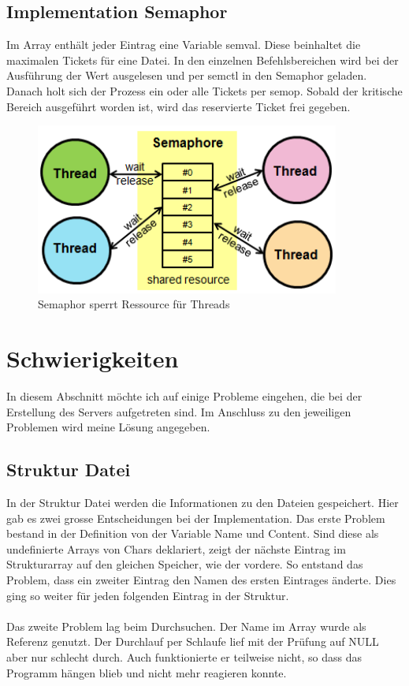\documentclass[12pt,a4paper,ngerman]{report}
\begin{document}
\subsection{Implementation Semaphor}
Im Array enthält jeder Eintrag eine Variable semval. Diese beinhaltet die maximalen Tickets für eine Datei. In den einzelnen Befehlsbereichen wird bei der Ausführung der Wert ausgelesen und per semctl in den Semaphor geladen. Danach holt sich der Prozess ein oder alle Tickets per semop. Sobald der kritische Bereich ausgeführt worden ist, wird das reservierte Ticket frei gegeben.
\begin{figure}[h!]
\centering
\includegraphics[width=10cm]{img/semaphore.png}
\caption{Semaphor sperrt Ressource für Threads\protect\footnotemark}
\end{figure}
\section{Schwierigkeiten}
In diesem Abschnitt möchte ich auf einige Probleme eingehen, die bei der Erstellung des Servers aufgetreten sind. Im Anschluss zu den jeweiligen Problemen wird meine Lösung angegeben.
\subsection{Struktur Datei}
In der Struktur Datei werden die Informationen zu den Dateien gespeichert. Hier gab es zwei grosse Entscheidungen bei der Implementation. Das erste Problem bestand in der Definition von der Variable Name und Content. Sind diese als undefinierte Arrays von Chars deklariert, zeigt der nächste Eintrag im Strukturarray auf den gleichen Speicher, wie der vordere. So entstand das Problem, dass ein zweiter Eintrag den Namen des ersten Eintrages änderte. Dies ging so weiter für jeden folgenden Eintrag in der Struktur.\\
\\
Das zweite Problem lag beim Durchsuchen. Der Name im Array wurde als Referenz genutzt. Der Durchlauf per Schlaufe lief mit der Prüfung auf NULL aber nur schlecht durch. Auch funktionierte er teilweise nicht, so dass das Programm hängen blieb und nicht mehr reagieren konnte.
\end{document}
